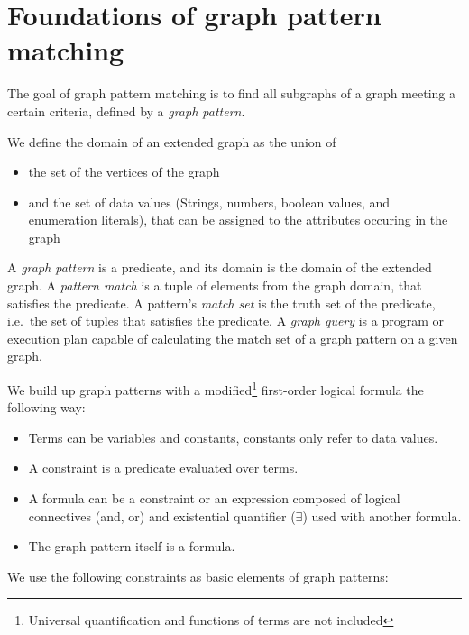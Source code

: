 \newpage
\section{Foundations of graph pattern matching}
\label{section:gpmc}


The goal of graph pattern matching is to find all subgraphs of a graph meeting a certain criteria, defined by a \emph{graph pattern}.

We define the domain of an extended graph as the union of 
\begin{itemize}
	\item the set of the vertices of the graph
	\item and the set of data values (Strings, numbers, boolean values, and enumeration literals), that can be assigned to the attributes occuring in the graph
\end{itemize}

A \emph{graph pattern} is a predicate, and its domain is the domain of the extended graph.
A \emph{pattern match} is a tuple of elements from the graph domain, that satisfies the predicate.
A pattern's \emph{match set} is the truth set of the predicate, i.e.\ the set of tuples that satisfies the predicate.
A \emph{graph query} is a program or execution plan capable of calculating the match set of a graph pattern on a given graph. 


We build up graph patterns with a modified\footnote{ Universal quantification and functions of terms are not included } first-order logical formula the following way:
\begin{itemize}
	\item Terms can be variables and constants, constants only refer to data values.
	\item A constraint is a predicate evaluated over terms. 
	\item A formula can be a constraint or an expression composed of logical connectives (and, or) and existential quantifier ($\exists{}$) used with another formula.
	\item The graph pattern itself is a formula.
\end{itemize}

We use the following constraints as basic elements of graph patterns:

